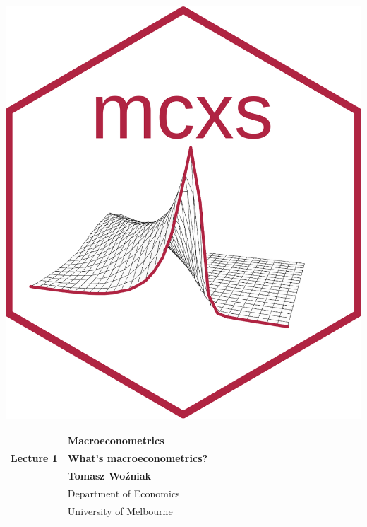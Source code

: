 \documentclass[notes,blackandwhite,mathsans]{beamer}
\begin{document}




\begin{frame}
\centering\includegraphics[scale=1.87]{mcxs.png}
\end{frame}




{
\begin{frame}

\vspace{1cm}
\begin{tabular}{rl}
&\textbf{\LARGE\color{mcxs1} Macroeconometrics}\\[6ex]
\textbf{\color{mcxs3}\Large Lecture 1}&\textbf{\Large\color{mcxs5}What's macroeconometrics?}\\[19ex]
&\textbf{\color{mcxs1} Tomasz Wo\'zniak}\\[1ex]
&{\small\color{mcxs5} Department of Economics}\\
&{\small\color{mcxs5}University of Melbourne}
\end{tabular}

\end{frame}
}
\end{document}
